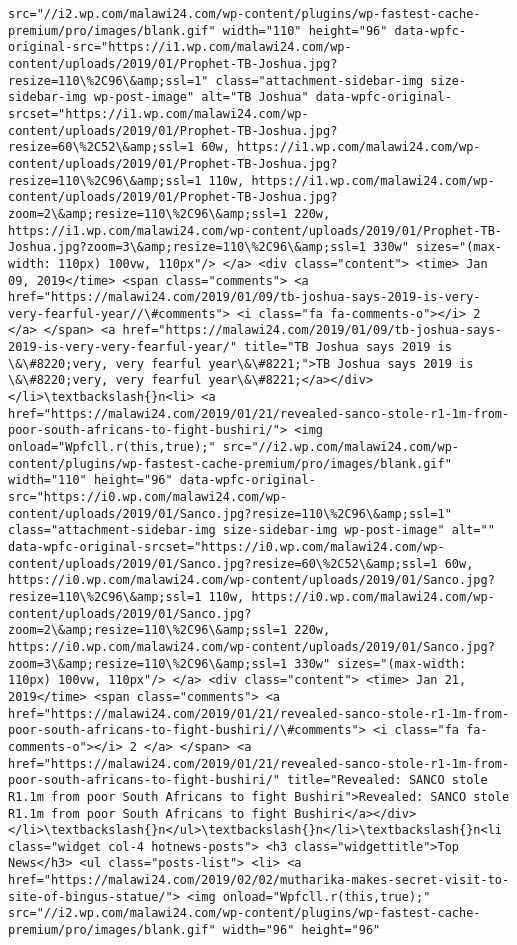 \documentclass[11pt]{article}
\begin{document}
\begin{Verbatim}[commandchars=\\\{\}]
src="//i2.wp.com/malawi24.com/wp-content/plugins/wp-fastest-cache-premium/pro/images/blank.gif" width="110" height="96" data-wpfc-original-src="https://i1.wp.com/malawi24.com/wp-content/uploads/2019/01/Prophet-TB-Joshua.jpg?resize=110\%2C96\&amp;ssl=1" class="attachment-sidebar-img size-sidebar-img wp-post-image" alt="TB Joshua" data-wpfc-original-srcset="https://i1.wp.com/malawi24.com/wp-content/uploads/2019/01/Prophet-TB-Joshua.jpg?resize=60\%2C52\&amp;ssl=1 60w, https://i1.wp.com/malawi24.com/wp-content/uploads/2019/01/Prophet-TB-Joshua.jpg?resize=110\%2C96\&amp;ssl=1 110w, https://i1.wp.com/malawi24.com/wp-content/uploads/2019/01/Prophet-TB-Joshua.jpg?zoom=2\&amp;resize=110\%2C96\&amp;ssl=1 220w, https://i1.wp.com/malawi24.com/wp-content/uploads/2019/01/Prophet-TB-Joshua.jpg?zoom=3\&amp;resize=110\%2C96\&amp;ssl=1 330w" sizes="(max-width: 110px) 100vw, 110px"/> </a> <div class="content"> <time> Jan 09, 2019</time> <span class="comments"> <a href="https://malawi24.com/2019/01/09/tb-joshua-says-2019-is-very-very-fearful-year//\#comments"> <i class="fa fa-comments-o"></i> 2 </a> </span> <a href="https://malawi24.com/2019/01/09/tb-joshua-says-2019-is-very-very-fearful-year/" title="TB Joshua says 2019 is \&\#8220;very, very fearful year\&\#8221;">TB Joshua says 2019 is \&\#8220;very, very fearful year\&\#8221;</a></div></li>\textbackslash{}n<li> <a href="https://malawi24.com/2019/01/21/revealed-sanco-stole-r1-1m-from-poor-south-africans-to-fight-bushiri/"> <img onload="Wpfcll.r(this,true);" src="//i2.wp.com/malawi24.com/wp-content/plugins/wp-fastest-cache-premium/pro/images/blank.gif" width="110" height="96" data-wpfc-original-src="https://i0.wp.com/malawi24.com/wp-content/uploads/2019/01/Sanco.jpg?resize=110\%2C96\&amp;ssl=1" class="attachment-sidebar-img size-sidebar-img wp-post-image" alt="" data-wpfc-original-srcset="https://i0.wp.com/malawi24.com/wp-content/uploads/2019/01/Sanco.jpg?resize=60\%2C52\&amp;ssl=1 60w, https://i0.wp.com/malawi24.com/wp-content/uploads/2019/01/Sanco.jpg?resize=110\%2C96\&amp;ssl=1 110w, https://i0.wp.com/malawi24.com/wp-content/uploads/2019/01/Sanco.jpg?zoom=2\&amp;resize=110\%2C96\&amp;ssl=1 220w, https://i0.wp.com/malawi24.com/wp-content/uploads/2019/01/Sanco.jpg?zoom=3\&amp;resize=110\%2C96\&amp;ssl=1 330w" sizes="(max-width: 110px) 100vw, 110px"/> </a> <div class="content"> <time> Jan 21, 2019</time> <span class="comments"> <a href="https://malawi24.com/2019/01/21/revealed-sanco-stole-r1-1m-from-poor-south-africans-to-fight-bushiri//\#comments"> <i class="fa fa-comments-o"></i> 2 </a> </span> <a href="https://malawi24.com/2019/01/21/revealed-sanco-stole-r1-1m-from-poor-south-africans-to-fight-bushiri/" title="Revealed: SANCO stole R1.1m from poor South Africans to fight Bushiri">Revealed: SANCO stole R1.1m from poor South Africans to fight Bushiri</a></div></li>\textbackslash{}n</ul>\textbackslash{}n</li>\textbackslash{}n<li class="widget col-4 hotnews-posts"> <h3 class="widgettitle">Top News</h3> <ul class="posts-list"> <li> <a href="https://malawi24.com/2019/02/02/mutharika-makes-secret-visit-to-site-of-bingus-statue/"> <img onload="Wpfcll.r(this,true);" src="//i2.wp.com/malawi24.com/wp-content/plugins/wp-fastest-cache-premium/pro/images/blank.gif" width="96" height="96" 
\end{Verbatim}
\end{document}
